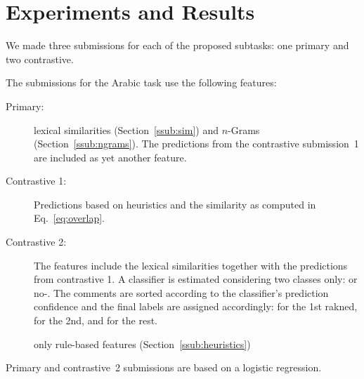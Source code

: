 \section{Experiments and Results}
\label{sec:experiments}

We made three submissions for each of the proposed subtasks: one primary and 
two contrastive. 

The submissions for the Arabic task use the following features:

\begin{description}
\item[Primary:] 
  lexical similarities (Section~\ref{ssub:sim}) and  $n$-Grams 
  (Section~\ref{ssub:ngrams}). The predictions from the contrastive 
  submission~1 are included as yet another feature. 
\item[Contrastive 1:] 
  Predictions based on heuristics and the similarity as computed in 
  Eq.~\eqref{eq:overlap}.     
\item[Contrastive 2:] 
  The features include the lexical similarities together with the predictions 
  from contrastive 1. A classifier is estimated considering two classes only: 
  \dir or no-\dir. The comments are sorted according to the classifier's 
  prediction confidence and the final labels are assigned accordingly: \dir for 
  the 1st rakned, \rel for the 2nd, and \irel for the rest.
  
  
  only rule-based features 
(Section~\ref{ssub:heuristics}) 
\end{description}

Primary and contrastive~2 submissions are based on a logistic regression. 



